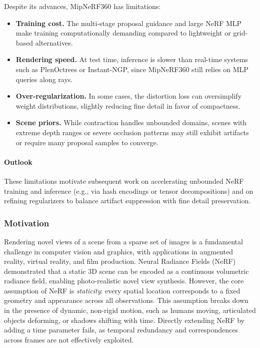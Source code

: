 \begin{enrichment}
\begin{enrichment}
        Despite its advances, MipNeRF360 has limitations:
        \begin{itemize}
            \item \textbf{Training cost.} The multi-stage proposal guidance and large NeRF MLP make training computationally demanding compared to lightweight or grid-based alternatives.
            \item \textbf{Rendering speed.} At test time, inference is slower than real-time systems such as PlenOctrees or Instant-NGP, since MipNeRF360 still relies on MLP queries along rays.
            \item \textbf{Over-regularization.} In some cases, the distortion loss can oversimplify weight distributions, slightly reducing fine detail in favor of compactness.
            \item \textbf{Scene priors.} While contraction handles unbounded domains, scenes with extreme depth ranges or severe occlusion patterns may still exhibit artifacts or require many proposal samples to converge.
        \end{itemize}
        
        \paragraph{Outlook}
        These limitations motivate subsequent work on accelerating unbounded NeRF training and inference (e.g., via hash encodings or tensor decompositions) and on refining regularizers to balance artifact suppression with fine detail preservation.
    
    \end{enrichment}
    
    \newpage 
    
    \begin{enrichment}
    \label{enr:subsec_chapter23_dnerf}
    
    \subsubsection{Motivation}
    \label{subsec:chapter23_dnerf_motivation}
    Rendering novel views of a scene from a sparse set of images is a fundamental challenge in computer vision and graphics, with applications in augmented reality, virtual reality, and film production. Neural Radiance Fields (NeRF)~\cite{mildenhall2020_nerf} demonstrated that a static 3D scene can be encoded as a continuous volumetric radiance field, enabling photo-realistic novel view synthesis. However, the core assumption of NeRF is \emph{staticity}: every spatial location corresponds to a fixed geometry and appearance across all observations. This assumption breaks down in the presence of dynamic, non-rigid motion, such as humans moving, articulated objects deforming, or shadows shifting with time. Directly extending NeRF by adding a time parameter fails, as temporal redundancy and correspondences across frames are not effectively exploited.
    

\end{enrichment}
\end{enrichment}
